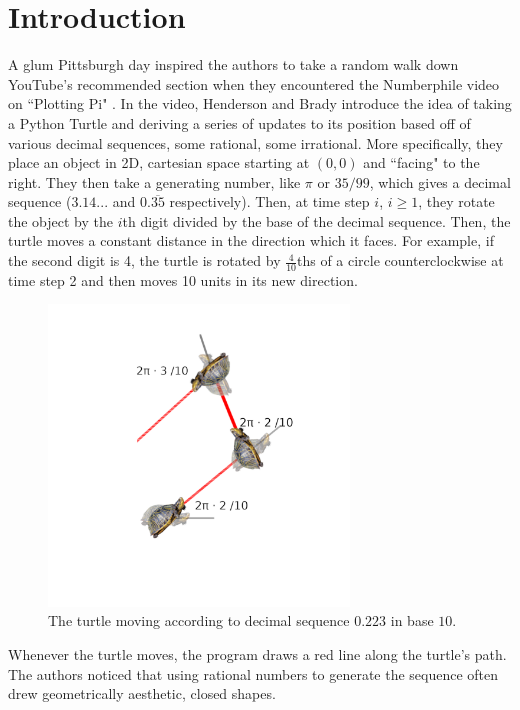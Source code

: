 \documentclass[11pt,titlepage]{article}
\begin{document}
\section{Introduction}
A glum Pittsburgh day inspired the authors to take a random walk down YouTube's recommended section
when they encountered the Numberphile video on ``Plotting Pi" \cite{NumberphileVid}.
In the video, Henderson and Brady introduce the idea of taking a Python Turtle and
deriving a series of updates to its position based off of various decimal sequences, 
some rational, some irrational. More specifically, they place an object in 2D, cartesian
space starting at $(0, 0)$ and ``facing" to the right. They then take a generating number, like $\pi$ or $35/99$, 
which gives a decimal sequence ($3.14...$ and $0.\overline{35}$ respectively). 
Then, at time step $i$, $i \geq 1$, they rotate the object by the $i$th digit divided by the base of
the decimal sequence. Then, the turtle moves a constant distance in the direction which it faces.
For example, if the second digit is 4, the turtle is rotated by $\frac{4}{10}$ths of a circle
counterclockwise at time step 2 and then moves 10 units in its new direction.
\begin{figure}[h!]
  \centering
  \includegraphics[width=8cm]{fig/turtle2dtimestep.png}
  \caption{The turtle moving according to decimal sequence $0.223$ in base $10$.}
\end{figure}

Whenever the turtle moves, the program draws a red line along the turtle's path.
The authors noticed that using rational numbers to generate the sequence often drew geometrically
aesthetic, closed shapes.
\end{document}
